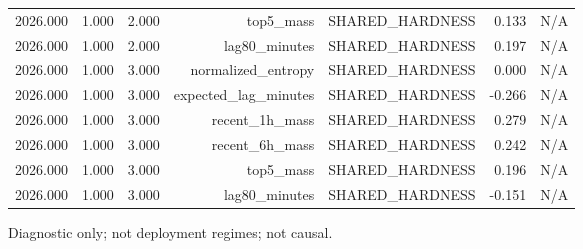 \begin{table}[h!]
\begin{tabular}{lrrrrrr}
2026.000 & 1.000 & 2.000 & top5\_mass & SHARED\_HARDNESS & 0.133 & N/A \\
2026.000 & 1.000 & 2.000 & lag80\_minutes & SHARED\_HARDNESS & 0.197 & N/A \\
2026.000 & 1.000 & 3.000 & normalized\_entropy & SHARED\_HARDNESS & 0.000 & N/A \\
2026.000 & 1.000 & 3.000 & expected\_lag\_minutes & SHARED\_HARDNESS & -0.266 & N/A \\
2026.000 & 1.000 & 3.000 & recent\_1h\_mass & SHARED\_HARDNESS & 0.279 & N/A \\
2026.000 & 1.000 & 3.000 & recent\_6h\_mass & SHARED\_HARDNESS & 0.242 & N/A \\
2026.000 & 1.000 & 3.000 & top5\_mass & SHARED\_HARDNESS & 0.196 & N/A \\
2026.000 & 1.000 & 3.000 & lag80\_minutes & SHARED\_HARDNESS & -0.151 & N/A \\
\bottomrule
\end{tabular}
\vspace{4pt}
\footnotesize{Diagnostic only; not deployment regimes; not causal.}\\
\end{table}
